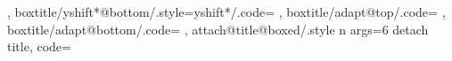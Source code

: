 {{{  }},
  boxtitle/yshift*@bottom/.style={yshift*/.code={%
    \tcbdimto{}%
    \tcbdimto\kvtcb@yinnershift@boxedtitle{\kvtcb@yshift@boxedtitle-\kvtcb@bottom@rule@stand}%
    \ifdim\dimexpr\kvtcb@yinnershift@boxedtitle<0pt\relax\let\kvtcb@yinnershift@boxedtitle\tcb@zpt\fi%
  }},
  boxtitle/adapt@top/.code={%
    \ifdim\dimexpr\tcboxedtitleheight+\kvtcb@yshift@boxedtitle>0pt\relax%
      \tcbdimto\kvtcb@bbtop@stand{\kvtcb@bbtop@stand+\tcboxedtitleheight+\kvtcb@yshift@boxedtitle}%
    \fi%
    \tcbdimto\kvtcb@top{\kvtcb@top-\kvtcb@yinnershift@boxedtitle}%
  },
  boxtitle/adapt@bottom/.code={%
    \ifdim\dimexpr\tcboxedtitleheight-\kvtcb@yshift@boxedtitle>0pt\relax%
      \tcbdimto\kvtcb@bbbottom@stand{\kvtcb@bbbottom@stand+\tcboxedtitleheight-\kvtcb@yshift@boxedtitle}%
    \fi%
    \tcbdimto\kvtcb@bottom{\kvtcb@bottom+\kvtcb@yinnershift@boxedtitle}%
  },
  attach@title@boxed/.style n args={6}{%
    detach title,
    code={\def\tcb@specialtitle@hook{%
      \ifx\tcbtitletext\@empty\else%
      \tcb@trans@set@boxedsize{#2}%
      \colorlet{tcbtranscol@frame}{tcbcolframe}%
      \colorlet{tcbtranscol@back}{tcbcolbacktitle}%
      \let\tcb@trans@skin@current\kvtcb@skin@current%
      \let\tcb@trans@boxedstyle\kvtcb@style@boxedtitle%
      \setbox\tcb@titlebox\color@hbox\bgroup\color{tcbcoltitle}\kvtcb@fonttitle\kvtcb@before@boxedtitle\kvtcb@haligntitle\kvtcb@before@title\tcbtitletext\kvtcb@after@title\kvtcb@after@boxedtitle\egroup\color@endbox%
      \setbox\tcb@titlebox\color@hbox\tcbox[skin=\tcb@trans@skin@current,colframe=tcbtranscol@frame,colback=tcbtranscol@back,%
          code={\pgfkeysalsofrom\tcb@trans@boxedsize\pgfkeysalsofrom\tcb@trans@boxedstyle%
            \ifcase#6
            \or%
              \global\tcbdimto\tcb@xshift@boxedtitle@delta{\kvtcb@left@rule+\kvtcb@boxsep+\kvtcb@leftupper}%
            \else%
              \global\tcbdimto\tcb@xshift@boxedtitle@delta{\kvtcb@right@rule+\kvtcb@boxsep+\kvtcb@rightupper}%
            \fi%
          }%
        ]{\box\tcb@titlebox}\color@endbox%
      \tcbdimto\tcboxedtitleheight{\ht\tcb@titlebox+\dp\tcb@titlebox}%
      \tcbdimto\tcboxedtitlewidth{\wd\tcb@titlebox}%
      \tcbset{boxtitle/.cd,xshift=0pt,yshift=0pt,yshifttext=0pt,yshift*@#2,#1,adapt@#2}%
      \let\tcb@specialgeonodes@first\relax%
      \let\tcb@specialgeonodes@middle\relax%
      \let\tcb@specialgeonodes@last\relax%
      \ifcase#6
        \tcbdimto\tcb@xshift@boxedtitle{\kvtcb@xshift@boxedtitle}%
      \or%
        \tcbdimto\tcb@xshift@boxedtitle{\kvtcb@left@rule+\kvtcb@boxsep+\kvtcb@leftupper-\tcb@xshift@boxedtitle@delta}%
}}}}
